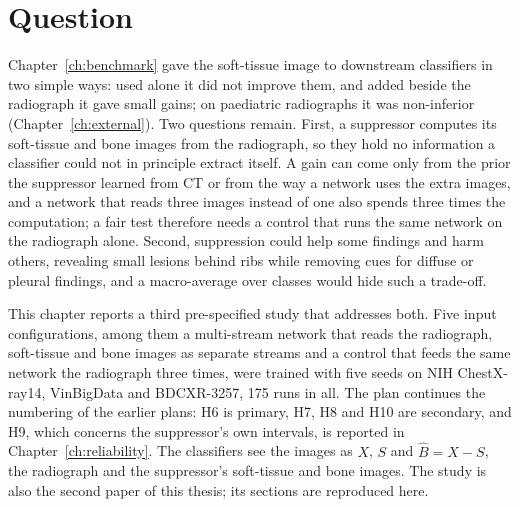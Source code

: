 \section{Question}
\label{sec:cls_intro}
Chapter~\ref{ch:benchmark} gave the soft-tissue image to downstream classifiers in two simple ways: used alone it did not improve them, and
added beside the radiograph it gave small gains; on paediatric radiographs it was non-inferior (Chapter~\ref{ch:external}). Two questions
remain. First, a suppressor computes its soft-tissue and bone images from the radiograph, so they hold no information a classifier could not
in principle extract itself. A gain can come only from the prior the suppressor learned from CT or from the way a network uses the extra
images, and a network that reads three images instead of one also spends three times the computation; a fair test therefore needs a control
that runs the same network on the radiograph alone. Second, suppression could help some findings and harm others, revealing small lesions
behind ribs while removing cues for diffuse or pleural findings, and a macro-average over classes would hide such a trade-off.

This chapter reports a third pre-specified study that addresses both. Five input configurations, among them a multi-stream network that
reads the radiograph, soft-tissue and bone images as separate streams and a control that feeds the same network the radiograph three times,
were trained with five seeds on NIH ChestX-ray14, VinBigData and BDCXR-3257, 175 runs in all. The plan continues the numbering of the earlier
plans: H6 is primary, H7, H8 and H10 are secondary, and H9, which concerns the suppressor's own intervals, is reported in
Chapter~\ref{ch:reliability}. The classifiers see the images as $X$, $S$ and $\hat B=X-S$, the radiograph and the suppressor's soft-tissue and
bone images. The study is also the second paper of this thesis; its sections are reproduced here.




